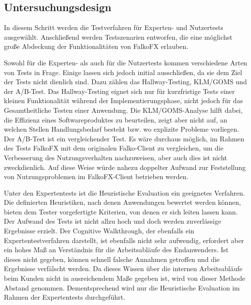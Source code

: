\subsection{Untersuchungsdesign}
In diesem Schritt werden die Testverfahren für Experten- und Nutzertests ausgewählt. Anschließend werden Testszenarien entworfen, die eine möglichst große Abdeckung der Funktionalitäten von FalkoFX erlauben.\par
{}
Sowohl für die Experten- als auch für die Nutzertests kommen verschiedene Arten von Tests in Frage. Einige lassen sich jedoch initial ausschließen, da sie dem Ziel der Tests nicht dienlich sind. Dazu zählen das Hallway-Testing, KLM/GOMS und der A/B-Test. Das Hallway-Testing eignet sich nur für kurzfristige Tests einer kleinen Funktionalität während der Implementierungsphase, nicht jedoch für das Gesamtheitliche Testen einer Anwendung. Die KLM/GOMS-Analyse hilft dabei, die Effizienz eines Softwareproduktes zu beurteilen, zeigt aber nicht auf, an welchen Stellen Handlungsbedarf besteht bzw. wo explizite Probleme vorliegen. Der A/B-Test ist ein vergleichender Test. Es wäre durchaus möglich, im Rahmen des Tests FalkoFX mit dem originalen Falko-Client zu vergleichen, um die Verbesserung des Nutzungsverhalten nachzuweisen, aber auch dies ist nicht zweckdienlich. Auf diese Weise würde nahezu doppelter Aufwand zur Feststellung von Nutzungsproblemen im FalkoFX-Client betrieben werden.\par
Unter den Expertentests ist die Heuristische Evaluation ein geeignetes Verfahren. Die definierten Heuristiken, nach denen Anwendungen bewertet werden können, bieten dem Tester vorgefertigte Kriterien, von denen er sich leiten lassen kann. Der Aufwand des Tests ist nicht allzu hoch und doch werden zuverlässige Ergebnisse erzielt. Der Cognitive Walkthrough, der ebenfalls ein Expertentestverfahren darstellt, ist ebenfalls nicht sehr aufwendig, erfordert aber ein hohes Maß an Verständnis für die Arbeitsabläufe des Endanwenders. Ist dieses nicht gegeben, können schnell falsche Annahmen getroffen und die Ergebnisse verfälscht werden. Da dieses Wissen über die internen Arbeitsabläufe beim Kunden nicht in ausreichendem Maße gegeben ist, wird von dieser Methode Abstand genommen. Dementsprechend wird nur die Heuristische Evaluation im Rahmen der Expertentests durchgeführt.\par
